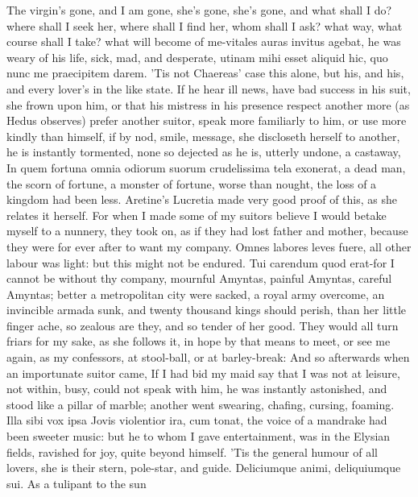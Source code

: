 The virgin's gone, and I am gone, she's gone, she's gone, and what
shall I do? where shall I seek her, where shall I find her, whom shall
I ask? what way, what course shall I take? what will become of
me-vitales auras invitus agebat, he was weary of his life, sick,
mad, and desperate, utinam mihi esset aliquid hic, quo nunc me
praecipitem darem. 'Tis not Chaereas' case this alone, but his, and
his, and every lover's in the like state. If he hear ill news, have bad
success in his suit, she frown upon him, or that his mistress in his
presence respect another more (as Hedus observes) prefer another
suitor, speak more familiarly to him, or use more kindly than himself,
if by nod, smile, message, she discloseth herself to another, he is
instantly tormented, none so dejected as he is, utterly undone, a
castaway, In quem fortuna omnia odiorum suorum crudelissima tela
exonerat, a dead man, the scorn of fortune, a monster of fortune, worse
than nought, the loss of a kingdom had been less. Aretine's
Lucretia made very good proof of this, as she relates it herself. For
when I made some of my suitors believe I would betake myself to a
nunnery, they took on, as if they had lost father and mother, because
they were for ever after to want my company. Omnes labores leves fuere,
all other labour was light: but this might not be endured. Tui
carendum quod erat-for I cannot be without thy company, mournful
Amyntas, painful Amyntas, careful Amyntas; better a metropolitan city
were sacked, a royal army overcome, an invincible armada sunk, and
twenty thousand kings should perish, than her little finger ache, so
zealous are they, and so tender of her good. They would all turn friars
for my sake, as she follows it, in hope by that means to meet, or see
me again, as my confessors, at stool-ball, or at barley-break: And so
afterwards when an importunate suitor came, If I had bid my maid
say that I was not at leisure, not within, busy, could not speak with
him, he was instantly astonished, and stood like a pillar of marble;
another went swearing, chafing, cursing, foaming. Illa sibi vox
ipsa Jovis violentior ira, cum tonat, \etc{} the voice of a mandrake had
been sweeter music: but he to whom I gave entertainment, was in the
Elysian fields, ravished for joy, quite beyond himself. 'Tis the
general humour of all lovers, she is their stern, pole-star, and guide.
Deliciumque animi, deliquiumque sui. As a tulipant to the sun
